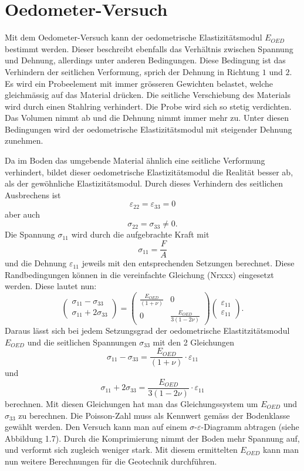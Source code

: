 \section{Oedometer-Versuch\label{spannung:section:Oedometer-Versuch}}
Mit dem Oedometer-Versuch kann der oedometrische Elastizitätsmodul $E_{OED}$ bestimmt werden.
Dieser beschreibt ebenfalls das Verhältnis zwischen Spannung und Dehnung, allerdings unter anderen Bedingungen.
Diese Bedingung ist das Verhindern der seitlichen Verformung, sprich der Dehnung in Richtung $1$ und $2$.
Es wird ein Probeelement mit immer grösseren Gewichten belastet, welche gleichmässig auf das Material drücken.
Die seitliche Verschiebung des Materials wird durch einen Stahlring verhindert.
Die Probe wird sich so stetig verdichten.
Das Volumen nimmt ab und die Dehnung nimmt immer mehr zu.
Unter diesen Bedingungen wird der oedometrische Elastizitätsmodul mit steigender Dehnung zunehmen.

Da im Boden das umgebende Material ähnlich eine seitliche Verformung verhindert,
bildet dieser oedometrische Elastizitätsmodul die Realität besser ab, als der gewöhnliche Elastizitätsmodul.
Durch dieses Verhindern des seitlichen Ausbrechens ist
\[
\varepsilon_{22}
=
\varepsilon_{33}
=
0
\]
aber auch
\[
\sigma_{22}
=
\sigma_{33}
\neq 0
.
\]
Die Spannung $\sigma_{11}$ wird durch die aufgebrachte Kraft mit
\[
\sigma_{11}
=
\frac{F}{A}
\]
und die Dehnung $\varepsilon_{11}$ jeweils mit den entsprechenden Setzungen berechnet.
Diese Randbedingungen können in die vereinfachte Gleichung (Nrxxx) eingesetzt werden.
Diese lautet nun:
\[
\begin{pmatrix}
	\sigma_{11}-\sigma_{33} \\
	\sigma_{11}+2\sigma_{33}
\end{pmatrix}
=
\begin{pmatrix}
	\frac{E_{OED}}{(1+\nu)} &                             0 \\
                          0 & \frac{E_{OED}}{3(1-2\nu)}
\end{pmatrix}
\begin{pmatrix}
	\varepsilon_{11}\\
	\varepsilon_{11}
\end{pmatrix}
.
\]
Daraus lässt sich bei jedem Setzungsgrad der oedometrische Elastitzitätsmodul $E_{OED}$ und die seitlichen Spannungen $\sigma_{33}$ mit den 2 Gleichungen
\[
\sigma_{11}-\sigma_{33}
=
\frac{E_{OED}}{(1+\nu)}\cdot\varepsilon_{11}
\]
und
\[
\sigma_{11}+2\sigma_{33}
=
\frac{E_{OED}}{3(1-2\nu)}\cdot\varepsilon_{11}
\]
berechnen.
Mit diesen Gleichungen hat man das Gleichungssystem um $E_{OED}$ und $\sigma_{33}$ zu berechnen.
Die Poisson-Zahl muss als Kennwert gemäss der Bodenklasse gewählt werden.
Den Versuch kann man auf einem $\sigma$-$\varepsilon$-Diagramm abtragen (siehe Abbildung 1.7).
Durch die Komprimierung nimmt der Boden mehr Spannung auf, und verformt sich zugleich weniger stark.
Mit diesem ermittelten $E_{OED}$ kann man nun weitere Berechnungen für die Geotechnik durchführen.

